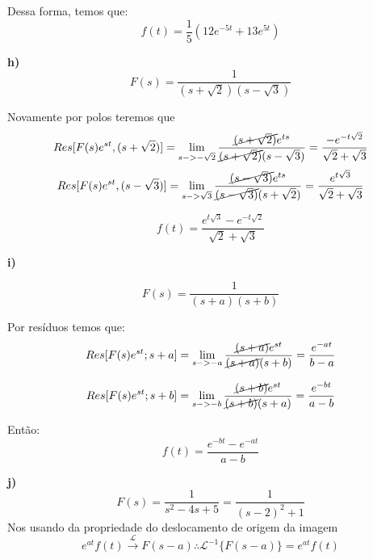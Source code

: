 Dessa forma, temos que:
\begin{equation*}
    \boxed{f(t) = \frac{1}{5}\left(12e^{-5t}+13e^{5t}\right)}
\end{equation*}

\textbf{h)}
\begin{equation*}
    F(s) = \frac{1}{(s+\sqrt{2})(s-\sqrt{3})}
\end{equation*}

Novamente por polos teremos que
\begin{equation*}
    Res[F(s)e^{st}, (s+\sqrt{2})] = \lim_{s->-\sqrt{2}} \frac{\cancel{(s+\sqrt{2})}e^{ts}}{\cancel{(s+\sqrt{2})}(s-\sqrt{3})} = \frac{-e^{-t\sqrt{2}}}{\sqrt{2}+\sqrt{3}}
\end{equation*}
\begin{equation*}
    Res[F(s)e^{st}, (s-\sqrt{3})] = \lim_{s->\sqrt{3}} \frac{\cancel{(s-\sqrt{3})}e^{ts}}{\cancel{(s-\sqrt{3})}(s+\sqrt{2})} = \frac{e^{t\sqrt{3}}}{\sqrt{2}+\sqrt{3}} 
\end{equation*}

\begin{equation*}
    \boxed{f(t) = \frac{e^{t\sqrt{3}}-e^{-t\sqrt{2}}}{\sqrt{2}+\sqrt{3}}}
\end{equation*}

\textbf{i)}

\begin{equation*}
    F(s) = \frac{1}{(s+a)(s+b)}
\end{equation*}

Por resíduos temos que:
\begin{equation*}
    Res[F(s)e^{st}; s+a] = \lim_{s->-a}\frac{\cancel{(s+a)}e^{st}}{\cancel{(s+a)}(s+b)} = \frac{e^{-at}}{b-a}
\end{equation*}

\begin{equation*}
    Res[F(s)e^{st}; s+b] = \lim_{s->-b}\frac{\cancel{(s+b)}e^{st}}{\cancel{(s+b)}(s+a)} = \frac{e^{-bt}}{a-b}
\end{equation*}

Então:
\begin{equation*}
    \boxed{f(t) = \frac{e^{-bt} - e^{-at}}{a-b}}
\end{equation*}

\textbf{j)}
\begin{equation*}
    F(s) = \frac{1}{s^2-4s+5} = \frac{1}{(s-2)^2+1}
\end{equation*}
Nos usando da propriedade do deslocamento de origem da imagem
\begin{equation*}
    e^{at}f(t) \xrightarrow{\mathcal{L}}F(s-a) \therefore \mathcal{L}^{-1}\{F(s-a)\} = e^{at}f(t)
\end{equation*}

